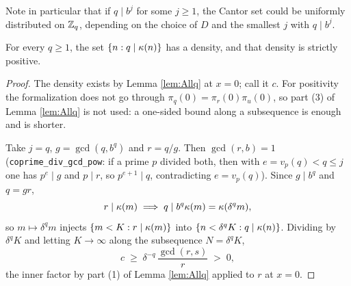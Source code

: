 Note in particular that if $q \mid b^j$ for some $j \geq 1$, the Cantor set
could be uniformly distributed on $\mathbb{Z}_q$, depending on the choice of $D$ and
the smallest $j$ with $q \mid b^j$.

\begin{lemma}[Lemma 5.5]
  \label{lem:positiveDensity}
  \leanok
  For every $q \geq 1$, the set $\{n : q \mid \kappa(n)\}$ has a density, and
  that density is strictly positive.
\end{lemma}
\begin{proof}
  \leanok
  The density exists by Lemma \ref{lem:Allq} at $x = 0$; call it $c$. For
  positivity the formalization does not go through
  $\pi_q(0) = \pi_r(0)\pi_u(0)$, so part (3) of Lemma \ref{lem:Allq} is not
  used: a one-sided bound along a subsequence is enough and is shorter.

  Take $j = q$, $g = \gcd(q,b^q)$ and $r = q/g$. Then $\gcd(r,b)=1$
  (\texttt{coprime\_div\_gcd\_pow}: if a prime $p$ divided both, then with
  $e = v_p(q) < q \le j$ one has $p^e \mid g$ and $p \mid r$, so
  $p^{e+1} \mid q$, contradicting $e = v_p(q)$). Since $g \mid b^q$ and
  $q = gr$,
  \[
    r \mid \kappa(m) \implies q \mid b^q\kappa(m) = \kappa(\delta^q m),
  \]
  so $m \mapsto \delta^q m$ injects $\{m < K : r \mid \kappa(m)\}$ into
  $\{n < \delta^qK : q \mid \kappa(n)\}$. Dividing by $\delta^qK$ and letting
  $K \to \infty$ along the subsequence $N = \delta^qK$,
  \[
    c \;\geq\; \delta^{-q}\,\frac{\gcd(r,s)}{r} \;>\; 0 ,
  \]
  the inner factor by part (1) of Lemma \ref{lem:Allq} applied to $r$ at
  $x = 0$.
\end{proof}

